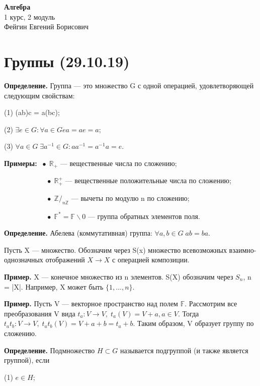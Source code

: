 \documentclass[12pt,a4paper]{article}
\begin{document}
\begin{center}
	\large \textbf{Алгебра} \\ 1 курс, 2 модуль\\ Фейгин Евгений Борисович
\end{center}
	
	\tableofcontents
	\newpage 
	
\section{Группы (29.10.19)}

\textbf{Определение.} Группа --- это множество G с одной операцией, удовлетворяющей следующим свойствам: 

(1) (ab)c = a(bc);

(2) $\exists e \in G: \forall a \in G ea = ae = a;$

(3) $\forall a \in G \; \exists a^{-1} \in G: aa^{-1} = a^{-1}a = e.$

\textbf{Примеры:} $\; \bullet \; \mathbb{R}_{+}$ --- вещественные числа по сложению; 

$\quad \quad \quad \quad \quad \quad \bullet \; \mathbb{R}_{+}^{+}$ --- вещественные положительные числа по сложению; 

$\quad \quad \quad \quad \quad \quad\bullet \; \mathbb{Z}/_{n\mathbb{Z}}$ --- вычеты по модулю n по сложению;

$\quad \quad \quad \quad \quad \quad\bullet \; \mathbb{F}^{*} = \mathbb{F} \backslash 0$ --- группа обратных элементов поля. 

\textbf{Определение.} Абелева (коммутативная) группа: $\forall a, b \in G \; ab = ba.$

Пусть X --- множество. Обозначим через S(x) множество всевозможных взаимно-однозначных отображений $X \to X$ с операцией композиции. 

\textbf{Пример.} X --- конечное множество из n элементов. S(X) обозначим через $S_n$, n = |X|. Например, X может быть $\{1, ..., n\}.$ 

\textbf{Пример.} Пусть V --- векторное пространство над полем $\mathbb{F}$. Рассмотрим все преобразования V вида $t_a: V \to V, \; t_{a}(V) = V + a, a \in V$. Тогда $t_{a}t_{b}: V \to V, \; t_{a}t_{b}(V) = V + a + b = t_{a} + b$. Таким образом, V образует группу по сложению. 

\textbf{Определение.} Подмножество $H \subset G$ называется подгруппой (и также является группой), если 

(1) $e \in H$; 
\end{document}
